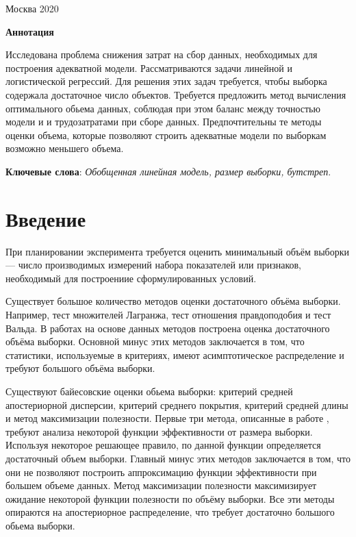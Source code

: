 \documentclass[12pt, a4paper]{scrartcl}
\theoremstyle{plain}
\theoremstyle{definition}
\begin{document}
     \linespread{1.3}    
 	\hfill \break
 	\hfill \break
 	\hfill \break
 	\hfill \break
 	\begin{center} Москва 2020 \end{center}
 	\thispagestyle{empty}

\newpage

\large\tableofcontents %
\newpage

\begin{center}
\textbf{Аннотация}
\end{center}

Исследована проблема снижения затрат на сбор данных, необходимых для построения
адекватной модели. Рассматриваются задачи линейной и логистической регрессий. Для решения этих задач требуется, чтобы выборка содержала достаточное число  объектов. Требуется предложить метод вычисления оптимального обьема данных, соблюдая при этом баланс между точностью модели и и трудозатратами при сборе данных. Предпочтительны те методы оценки объема, которые позволяют строить адекватные модели по выборкам возможно меньшего объема.

\bigskip

\textbf{Ключевые слова}: \emph {Обобщенная линейная модель, размер выборки, бутстреп}.

\newpage

\section{Введение}
При планировании эксперимента требуется оценить минимальный объём выборки — число производимых измерений набора показателей или признаков, необходимый для построениие сформулированных условий. 

Существует большое количество методов оценки достаточного объёма выборки. Например, тест множителей Лагранжа, тест отношения правдоподобия и тест Вальда. В работах \cite{Self-Mauritsen-1998, Shieh-2000, Shieh-2005} на основе данных методов построена оценка достаточного объёма выборки. Основной минус этих методов заключается в том, что статистики, используемые в критериях, имеют асимптотическое распределение и требуют большого объёма выборки.

Существуют байесовские оценки обьема выборки: критерий средней апостериорной дисперсии, критерий среднего покрытия, критерий средней длины и метод максимизации полезности. Первые три метода, описанные в работе \cite{Wang-Gelfand-2002}, требуют анализа некоторой функции эффективности от размера выборки. Используя некоторое решающее правило, по данной функции определяется достаточный объем выборки. Главный минус этих методов заключается в том, что они не позволяют построить аппроксимацию функции эффективности при большем объеме данных. Метод максимизации полезности максимизирует ожидание некоторой функции полезности по объёму выборки. Все эти методы опираются на апостериорное распределение, что требует достаточно большого обьема выборки.
\end{document}
